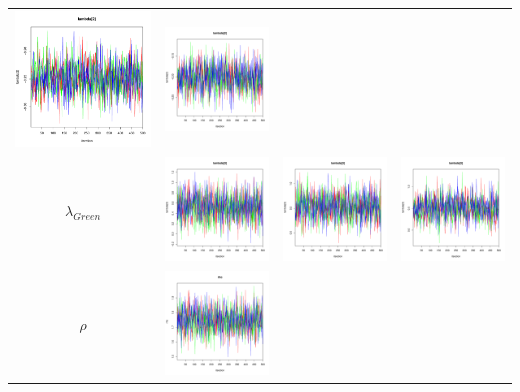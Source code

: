 \documentclass[letter,12pt]{article}
\begin{document}
\begin{table}
\begin{tabular}{cccc}
                        \includegraphics[width=.15\columnwidth]{../graphs/traceplots/2012d0vbar_3.pdf} &
                         \includegraphics[width=.15\columnwidth]{../graphs/traceplots/2012d0wbar_3.pdf} \\
    $\lambda_{Green}$  & \includegraphics[width=.15\columnwidth]{../graphs/traceplots/2012d0v_4.pdf} &
                        \includegraphics[width=.15\columnwidth]{../graphs/traceplots/2012d0vbar_4.pdf} &
                         \includegraphics[width=.15\columnwidth]{../graphs/traceplots/2012d0wbar_4.pdf} \\
    $\rho$           & \includegraphics[width=.15\columnwidth]{../graphs/traceplots/2012d0v_7.pdf} &

\end{tabular}
\end{table}
\end{document}
